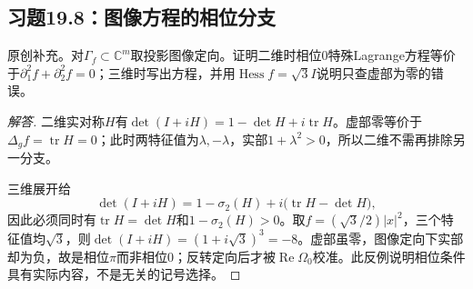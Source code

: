\subsection*{习题19.8：图像方程的相位分支}
原创补充。对$\Gamma_f\subset\mathbb C^m$取投影图像定向。证明二维时相位0特殊Lagrange方程等价于$\partial_1^2f+\partial_2^2f=0$；三维时写出方程，并用$\operatorname{Hess}f=\sqrt3 I$说明只查虚部为零的错误。
\begin{proof}[解答]
二维实对称$H$有$\det(I+iH)=1-\det H+i\operatorname{tr}H$。虚部零等价于$\Delta_g f=\operatorname{tr}H=0$；此时两特征值为$\lambda,-\lambda$，实部$1+\lambda^2>0$，所以二维不需再排除另一分支。

三维展开给
\[
 \det(I+iH)=1-\sigma_2(H)+i\bigl(\operatorname{tr}H-\det H\bigr),
\]
因此必须同时有$\operatorname{tr}H=\det H$和$1-\sigma_2(H)>0$。取$f=(\sqrt3/2)|x|^2$，三个特征值均$\sqrt3$，则$\det(I+iH)=(1+i\sqrt3)^3=-8$。虚部虽零，图像定向下实部却为负，故是相位$\pi$而非相位0；反转定向后才被$\operatorname{Re}\Omega_0$校准。此反例说明相位条件具有实际内容，不是无关的记号选择。
\end{proof}
